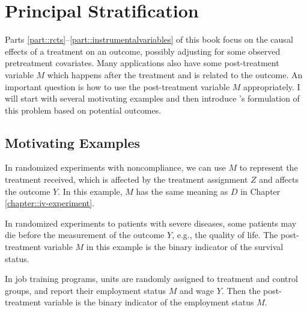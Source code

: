 
\chapter{Principal Stratification}
 \label{chapter::principal-stratification}

Parts \ref{part::rcts}--\ref{part::instrumentalvariables} of this book focus on the causal effects of a treatment on an outcome, possibly adjusting for some observed pretreatment covariates. Many applications also have some post-treatment variable $M$ which happens after the treatment and is related to the outcome. An important question is how to use the post-treatment variable $M$ appropriately. I will start with several motivating examples and then introduce \citet{frangakis2002principal}'s formulation of this problem based on potential outcomes. 
 


\section{Motivating Examples}



\begin{example}[noncompliance]\label{eg::noncompliance}
In randomized experiments with noncompliance, we can use $M$ to represent the treatment received, which is affected by the treatment assignment $Z$ and affects the outcome $Y$. 
In this example, $M$ has the same meaning as $D$ in Chapter \ref{chapter::iv-experiment}.
\end{example}


\begin{example}\label{eq::truncationbydeath}
In randomized experiments to patients with severe diseases, some patients may die before the measurement of the outcome $Y$, e.g., the quality of life. The post-treatment variable $M$ in this example is the binary indicator of the survival status. 
\end{example}




\begin{example}[unemployment]\label{eg::unemployment}
In job training programs, units are randomly assigned to treatment and control groups, and report their employment status $M$ and wage $Y$. Then the post-treatment variable is the binary indicator of the employment status $M$. 
\end{example}




